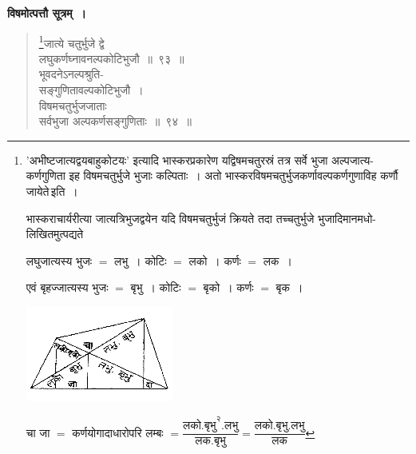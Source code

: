 \documentclass[11pt, openany]{book}
\begin{document}
\textbf{विषमोत्पत्तौ सूत्रम्~।} 
\begin{quote}
    \bs 
     \footnote{'{\color{violet}अभीष्टजात्यद्वयबाहुकोटयः}' इत्यादि {\color{violet}भास्कर}प्रकारेण यद्विषमचतुरस्रं तत्र सर्वे भुजा अल्पजात्य-कर्णगुणिता इह विषमचतुर्भुजे भुजाः कल्पिताः~। अतो भास्करविषमचतुर्भुजकर्णावल्पकर्णगुणाविह कर्णौ जायेते\textendash \,इति~।
\vspace{1mm}

\hspace{2mm} भास्कराचार्यरीत्या जात्यत्रिभुजद्वयेन यदि विषमचतुर्भुजं क्रियते तदा तच्चतुर्भुजे भुजादिमानमधो-लिखितमुत्पद्यते\textendash 
\vspace{1mm}

\hspace{6mm} लघुजात्यस्य भुजः $=$ लभु~। कोटिः $=$ लको~। कर्णः $=$ लक~।
\vspace{1mm}

\hspace{6mm} एवं बृहज्जात्यस्य भुजः $=$ बृभु~। कोटिः $=$ बृको~। कर्णः $=$ बृक~। 
\vspace{-4mm} 

\begin{center}
    \includegraphics[scale=0.8]{graphics/capture114.png}
\end{center}
\vspace{-4mm} 

\hspace{2mm} चा जा $=$ कर्णयोगादाधारोपरि लम्बः $= \dfrac{\mbox{लको.बृभु}^{\text{२}}.\mbox{लभु}}{\mbox{लक.बृभु}} = \dfrac{\mbox{लको.बृभु.लभु}}{\mbox{लक}}$}जात्ये चतुर्भुजे द्वे \\
लघुकर्णघ्नावनल्पकोटिभुजौ~॥~९३~॥\\
भूवदनेऽनल्पश्रुति-\\
सङ्गुणितावल्पकोटिभुजौ~।\\
विषमचतुर्भुजजाताः \\
सर्वभुजा अल्पकर्णसङ्गुणिताः~॥~९४~॥
\end{quote}

\newpage%
 
\end{document}
